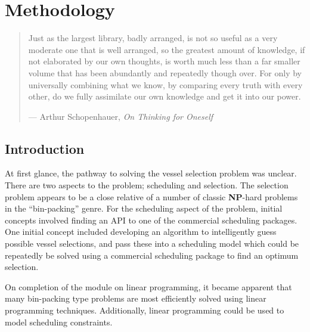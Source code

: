 %
%
%
%

\chapter{Methodology}\label{C.methodology}

\begin{quote}
Just as the largest library, badly arranged, is not so useful as a very
moderate one that is well arranged, so the greatest amount of knowledge, if not
elaborated by our own thoughts, is worth much less than a far smaller volume
that has been abundantly and repeatedly though over.  For only by universally
combining what we know, by comparing every truth with every other, do we fully
assimilate our own knowledge and get it into our power.

\hspace{2cm}--- Arthur Schopenhauer, \emph{On Thinking for Oneself}
\end{quote}

\section{Introduction}\label{S.intro4}

At first glance, the pathway to solving the vessel selection problem was
unclear.
There are two aspects to the problem; scheduling and selection.
The selection problem appears to be a close relative of a number of classic
\textbf{NP}-hard problems in the ``bin-packing'' genre.
For the scheduling aspect of the problem, initial concepts involved finding an
API to one of the commercial scheduling packages.
One initial concept included developing an algorithm to intelligently guess
possible vessel selections, and pass these into a scheduling model which
could be repeatedly be solved using a commercial scheduling package
to find an optimum selection.

On completion of the module on linear programming, it became apparent that
many bin-packing type problems are most efficiently solved using linear
programming techniques.
Additionally, linear programming could be used to model scheduling constraints.


